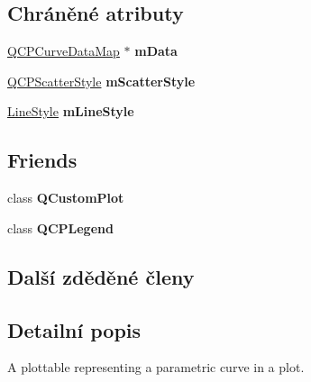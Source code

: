 \subsection*{Chráněné atributy}
\begin{DoxyCompactItemize}
\item 
\hypertarget{classQCPCurve_a88d533e455bca96004b049e99168731b}{}\hyperlink{qcustomplot_8h_a444d37ec9cb2951b3a7fe443c34d1658}{Q\+C\+P\+Curve\+Data\+Map} $\ast$ {\bfseries m\+Data}\label{classQCPCurve_a88d533e455bca96004b049e99168731b}

\item 
\hypertarget{classQCPCurve_a08f803b4a30b01bbd7a1eab15d0f864f}{}\hyperlink{classQCPScatterStyle}{Q\+C\+P\+Scatter\+Style} {\bfseries m\+Scatter\+Style}\label{classQCPCurve_a08f803b4a30b01bbd7a1eab15d0f864f}

\item 
\hypertarget{classQCPCurve_ae1f35ae2b15aee8e15bcdfec5be95156}{}\hyperlink{classQCPCurve_a2710e9f79302152cff794c6e16cc01f1}{Line\+Style} {\bfseries m\+Line\+Style}\label{classQCPCurve_ae1f35ae2b15aee8e15bcdfec5be95156}

\end{DoxyCompactItemize}
\subsection*{Friends}
\begin{DoxyCompactItemize}
\item 
\hypertarget{classQCPCurve_a1cdf9df76adcfae45261690aa0ca2198}{}class {\bfseries Q\+Custom\+Plot}\label{classQCPCurve_a1cdf9df76adcfae45261690aa0ca2198}

\item 
\hypertarget{classQCPCurve_a8429035e7adfbd7f05805a6530ad5e3b}{}class {\bfseries Q\+C\+P\+Legend}\label{classQCPCurve_a8429035e7adfbd7f05805a6530ad5e3b}

\end{DoxyCompactItemize}
\subsection*{Další zděděné členy}


\subsection{Detailní popis}
A plottable representing a parametric curve in a plot. 



